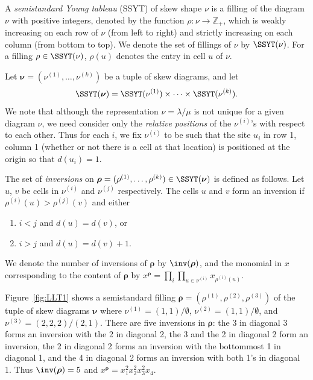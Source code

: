 A \emph{semistandard Young tableau} (SSYT) of skew shape $\nu$ is a filling of the diagram $\nu$ with positive integers, denoted by the function $\rho:\nu \rightarrow \mathbb{Z}_+$, which is weakly increasing on each row of $\nu$ (from left to right) and strictly increasing on each column (from bottom to top). We denote the set of fillings of $\nu$ by $\SSYT(\nu)$. For a filling $\rho\in\SSYT(\nu)$, $\rho(u)$ denotes the entry in cell $u$ of $\nu$.

Let $\boldsymbol{\nu}=(\nu^{(1)},\ldots,\nu^{(k)})$ be a tuple of skew diagrams, and let 
\[
\SSYT(\boldsymbol{\nu})=\SSYT(\nu^{(1)})\times\cdots\times\SSYT(\nu^{(k)}).
\] 
We note that although the representation $\nu=\lambda/\mu$ is not unique for a given diagram $\nu$, we need consider only the \emph{relative positions} of the $\nu^{(i)}$'s with respect to each other. Thus for each $i$, we fix $\nu^{(i)}$ to be such that the site $u_i$ in row 1, column 1 (whether or not there is a cell at that location) is positioned at the origin so that $d(u_i)=1$. 

\begin{defn}\label{def:LLTinversions}
The set of \emph{inversions} on $\boldsymbol{\rho}=(\rho^{(1)},\ldots,\rho^{(k)})\in\SSYT(\boldsymbol{\nu})$ is defined as follows. Let $u$, $v$ be cells in $\nu^{(i)}$ and $\nu^{(j)}$ respectively.
The cells $u$ and $v$ form an inversion if $\rho^{(i)}(u)>\rho^{(j)}(v)$ and either
\begin{enumerate}[label=\roman*.]
\item $i<j$ and $d(u)=d(v)$, or
\item $i>j$ and $d(u)=d(v)+1$.
\end{enumerate}
\end{defn}

We denote the number of inversions of $\boldsymbol{\rho}$ by $\inv(\boldsymbol{\rho})$, and 
the monomial in $x$ corresponding to the content of $\boldsymbol{\rho}$ by
$x^{\boldsymbol{\rho}} = \prod_i \prod_{u\in \nu^{(i)}} x_{\rho^{(i)}(u)}$. 

\begin{example}
Figure~\ref{fig:LLT1} shows a semistandard filling $\boldsymbol{\rho}=(\rho^{(1)},\rho^{(2)},\rho^{(3)})$ of the tuple of skew diagrams $\boldsymbol{\nu}$ where $\nu^{(1)}=(1,1)/\emptyset$, $\nu^{(2)}=(1,1)/\emptyset$, and $\nu^{(3)}=(2,2,2)/(2,1)$. There are five inversions in $\boldsymbol{\rho}$: the 3 in diagonal 3 forms an inversion with the 2 in diagonal 2, the 3 and the 2 in diagonal 2 form an inversion, the 2 in diagonal 2 forms an inversion with the bottommost 1 in diagonal 1, and the 4 in diagonal 2 forms an inversion with both 1's in diagonal 1. Thus $\inv(\boldsymbol{\rho})=5$ and $x^{\boldsymbol{\rho}}=x_1^2x_2^2x_3^2x_4$.
\end{example}


